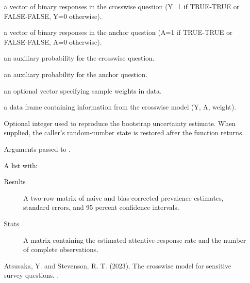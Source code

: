 \documentclass[a4paper]{book}
\begin{document}
\begin{Arguments}
\begin{ldescription}
\item[\code{Y}] a vector of binary responses in the crosswise question (Y=1 if TRUE-TRUE or FALSE-FALSE, Y=0 otherwise).

\item[\code{A}] a vector of binary responses in the anchor question (A=1 if TRUE-TRUE or FALSE-FALSE, A=0 otherwise).

\item[\code{p}] an auxiliary probability for the crosswise question.

\item[\code{p.prime}] an auxiliary probability for the anchor question.

\item[\code{weight}] an optional vector specifying sample weights in data.

\item[\code{data}] a data frame containing information from the crosswise model (Y, A, weight).

\item[\code{seed}] Optional integer used to reproduce the bootstrap uncertainty
estimate. When supplied, the caller's random-number state is restored after
the function returns.

\item[\code{...}] Arguments passed to .
\end{ldescription}
\end{Arguments}
%
\begin{Value}
A list with:
\begin{description}

\item[Results] A two-row matrix of naive and bias-corrected prevalence
estimates, standard errors, and 95 percent confidence intervals.
\item[Stats] A matrix containing the estimated attentive-response rate and
the number of complete observations.

\end{description}

\end{Value}
%
\begin{References}
Atsusaka, Y. and Stevenson, R. T. (2023). The crosswise model
for sensitive survey questions. .
\end{References}
\end{document}
